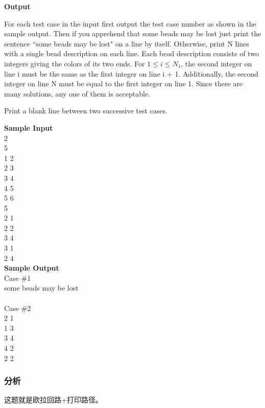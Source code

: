 \textbf{Output}

For each test case in the input first output the test case number as shown in the sample output. Then 
if you apprehend that some beads may be lost just print the sentence ``some beads may be lost" on a 
line by itself. Otherwise, print N lines with a single bead description on each line. Each bead 
description consists of two integers giving the colors of its two ends. For $1 \leq i \leq N_1$, the second integer 
on line i must be the same as the first integer on line i + 1. Additionally, the second integer 
on line N must be equal to the first integer on line 1. Since there are many solutions, any one
 of them is acceptable.

Print a blank line between two successive test cases.

\textbf{Sample Input} \\
2 \\
5 \\
1 2 \\
2 3 \\
3 4 \\
4 5 \\
5 6 \\
5 \\
2 1 \\
2 2 \\
3 4 \\
3 1 \\
2 4 \\

\textbf{Sample Output} \\
Case \#1 \\
some beads may be lost \\
\\
Case \#2 \\
2 1 \\
1 3 \\
3 4 \\
4 2 \\
2 2 \\

\subsubsection{分析}
这题就是欧拉回路+打印路径。

